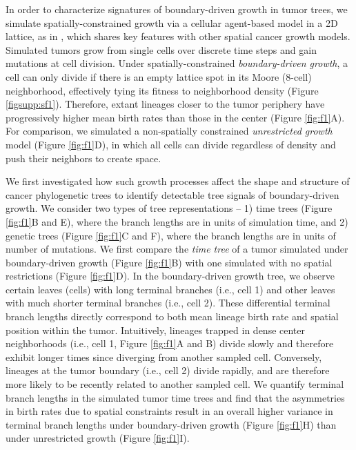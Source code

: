 \documentclass[12pt]{elife_based}
\begin{document}
In order to characterize signatures of boundary-driven growth in tumor trees, we simulate spatially-constrained growth via a cellular agent-based model in a 2D lattice, as in \cite{Chkhaidze:2019uw}, which shares key features with other spatial cancer growth models. Simulated tumors grow from single cells over discrete time steps and gain mutations at cell division. Under spatially-constrained \textit{boundary-driven growth}, a cell can only divide if there is an empty lattice spot in its Moore (8-cell) neighborhood, effectively tying its fitness to neighborhood density (Figure \ref{figsupp:sf1}). Therefore, extant lineages closer to the tumor periphery have progressively higher mean birth rates than those in the center (Figure \ref{fig:f1}A). For comparison, we simulated a non-spatially constrained \textit{unrestricted growth} model (Figure \ref{fig:f1}D), in which all cells can divide regardless of density and push their neighbors to create space. 

We first investigated how such growth processes affect the shape and structure of cancer phylogenetic trees to identify detectable tree signals of boundary-driven growth. We consider two types of tree representations -- 1) time trees (Figure \ref{fig:f1}B and E), where the branch lengths are in units of simulation time, and 2) genetic trees (Figure \ref{fig:f1}C and F), where the branch lengths are in units of number of mutations. We first compare the \textit{time tree} of a tumor simulated under boundary-driven growth (Figure \ref{fig:f1}B) with one simulated with no spatial restrictions (Figure \ref{fig:f1}D). In the boundary-driven growth tree, we observe certain leaves (cells) with long terminal branches (i.e., cell 1) and other leaves with much shorter terminal branches (i.e., cell 2). These differential terminal branch lengths directly correspond to both mean lineage birth rate and spatial position within the tumor. Intuitively, lineages trapped in dense center neighborhoods (i.e., cell 1, Figure \ref{fig:f1}A and B) divide slowly and therefore exhibit longer times since diverging from another sampled cell. Conversely, lineages at the tumor boundary (i.e., cell 2) divide rapidly, and are therefore more likely to be recently related to another sampled cell. We quantify terminal branch lengths in the simulated tumor time trees and find that the asymmetries in birth rates due to spatial constraints result in an overall higher variance in terminal branch lengths under boundary-driven growth (Figure \ref{fig:f1}H) than under unrestricted growth (Figure \ref{fig:f1}I).
\end{document}
